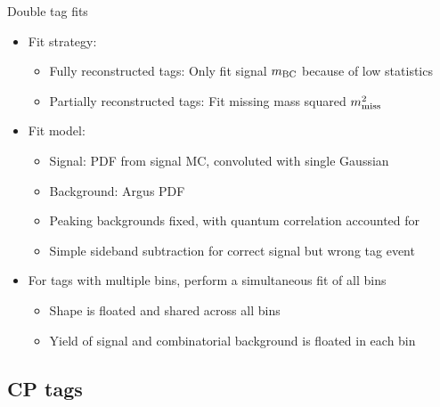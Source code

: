 \documentclass{beamer}
\begin{document}
\begin{frame}{Double tag fits}
  \begin{itemize}
    \setlength\itemsep{1.0em}
    \item{Fit strategy:}
    \begin{itemize}
      \item{Fully reconstructed tags: Only fit signal $m_{\rm BC}$ because of low statistics}
      \item{Partially reconstructed tags: Fit missing mass squared $m^2_{\rm miss}$}
    \end{itemize}
    \item{Fit model:}
    \begin{itemize}
      \item{Signal: PDF from signal MC, convoluted with single Gaussian}
      \item{Background: Argus PDF}
      \item{Peaking backgrounds fixed, with quantum correlation accounted for}
      \item{Simple sideband subtraction for correct signal but wrong tag event}
    \end{itemize}
    \item{For tags with multiple bins, perform a simultaneous fit of all bins}
    \begin{itemize}
      \item{Shape is floated and shared across all bins}
      \item{Yield of signal and combinatorial background is floated in each bin}
    \end{itemize}
  \end{itemize}
\end{frame}

\subsection{CP tags}
\end{document}
